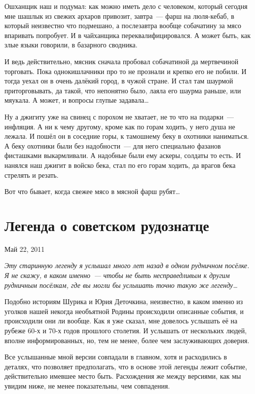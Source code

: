 Ошханщик наш и подумал: как можно иметь дело с человеком, который сегодня мне шашлык из свежих архаров привозит, завтра~--- фарш на люля-кебаб, в который неизвестно что подмешано, а послезавтра вообще собачатину за мясо впаривать попробует. И в чайханщика переквалифицировался. А может быть, как злые языки говорили, в базарного сводника.

И ведь действительно, мясник сначала пробовал собачатиной да мертвечиной торговать. Пока однокишлачники про то не прознали и крепко его не побили. И тогда уехал он в очень далёкий город, в чужой стране. И стал там шаурмой приторговывать, да такой, что непонятно было, лаяла его шаурма раньше, или мяукала. А может, и вопросы глупые задавала\dots

Ну а джигиту уже на свинец с порохом не хватает, не то что на подарки~--- инфляция. А ни к чему другому, кроме как по горам ходить, у него душа не лежала. И пошёл он в соседние горы, к тамошнему беку в охотники наниматься. А беку охотники были без надобности~--- для него специально фазанов фисташками выкармливали. А надобные были ему аскеры, солдаты то есть. И нанялся наш джигит в войско бека, стал по его горам ходить, да врагов бека стрелять и резать.

Вот что бывает, когда свежее мясо в мясной фарш рубят\dots

\section{Легенда о советском рудознатце} 
\begin{timeline}Май 22, 2011\end{timeline}

\textsl{Эту старинную легенду я услышал много лет назад в одном рудничном посёлке. Я не скажу, в каком именно~--- чтобы не быть несправедливым к другим рудничным посёлкам, где вы могли бы услышать точно такую же легенду\dots}\medskip

Подобно историям Шурика и Юрия Деточкина, неизвестно, в каком именно из уголков нашей некогда необъятной Родины происходили описанные события, и происходили они ли вообще. Как я уже сказал, мне довелось услышать её на рубеже 60-х и 70-х годов прошлого столетия. И услышать от нескольких людей, вполне информированных, но, тем не менее, более чем заслуживающих доверия.

Все услышанные мной версии совпадали в главном, хотя и расходились в деталях, что позволяет предполагать, что в основе этой легенды лежит событие, действительно имевшее место быть. Расхождения же между версиями, как мы увидим ниже, не менее показательны, чем совпадения.

